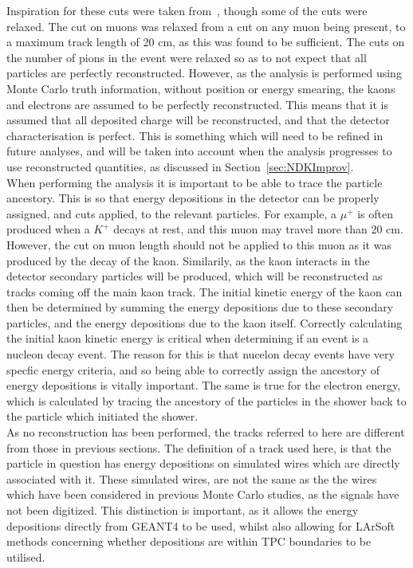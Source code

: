 Inspiration for these cuts were taken from~\citep{Bueno}, though some of the cuts were relaxed. The cut on muons was relaxed from a cut on any muon being present, to a maximum track length of 20 cm, as this was found to be sufficient. The cuts on the number of pions in the event were relaxed so as to not expect that all particles are perfectly reconstructed. However, as the analysis is performed using Monte Carlo truth information, without position or energy smearing, the kaons and electrons are assumed to be perfectly reconstructed. This means that it is assumed that all deposited charge will be reconstructed, and that the detector characterisation is perfect. This is something which will need to be refined in future analyses, and will be taken into account when the analysis progresses to use reconstructed quantities, as discussed in Section~\ref{sec:NDKImprov}. \\ 

When performing the analysis it is important to be able to trace the particle ancestory. This is so that energy depositions in the detector can be properly assigned, and cuts applied, to the relevant particles. For example, a $\mu^{+}$ is often produced when a $K^{+}$ decays at rest, and this muon may travel more than 20 cm. However, the cut on muon length should not be applied to this muon as it was produced by the decay of the kaon. Similarily, as the kaon interacts in the detector secondary particles will be produced, which will be reconstructed as tracks coming off the main kaon track. The initial kinetic energy of the kaon can then be determined by summing the energy depositions due to these secondary particles, and the energy depositions due to the kaon itself. Correctly calculating the initial kaon kinetic energy is critical when determining if an event is a nucleon decay event. The reason for this is that nucelon decay events have very specfic energy criteria, and so being able to correctly assign the ancestory of energy depositions is vitally important. The same is true for the electron energy, which is calculated by tracing the ancestory of the particles in the shower back to the particle which initiated the shower.\\

As no reconstruction has been performed, the tracks referred to here are different from those in previous sections. The definition of a track used here, is that the particle in question has energy depositions on simulated wires which are directly associated with it. These simulated wires, are not the same as the the wires which have been considered in previous Monte Carlo studies, as the signals have not been digitized. This distinction is important, as it allows the energy depositions directly from GEANT4 to be used, whilst also allowing for LArSoft methods concerning whether depositions are within TPC boundaries to be utilised. \\

